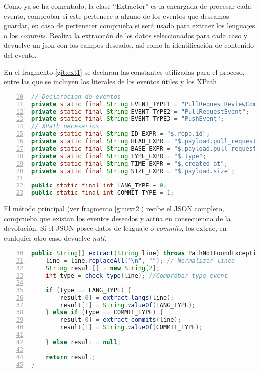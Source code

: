 Como ya se ha comentado, la clase ``Extractor'' es la encargada de procesar cada evento, comprobar si este pertenece a alguno de los eventos que deseamos guardar, en caso de pertenecer comprueba si será usado para extraer los lenguajes o los \textit{commits}. Realiza la extracción de los datos seleccionados para cada caso y devuelve un json con los campos deseados, así como la identificación de contenido del evento.

En el fragmento \ref{git:ext1} se declaran las constantes utilizadas para el proceso, entre las que se incluyen los literales de los eventos útiles y los \gls{XPath}

\clearpage
\begin{lstlisting}[label=git:ext1,language=java,frame=single,caption={Fragmento de la clase \textit{Extractor}. Declaración de constantes.}, firstnumber=10,numbers=left]
// Declaracion de eventos
private static final String EVENT_TYPE1 = "PullRequestReviewCommentEvent";
private static final String EVENT_TYPE2 = "PullRequestEvent";
private static final String EVENT_TYPE3 = "PushEvent";
// XPath necesarios
private static final String ID_EXPR = "$.repo.id";
private static final String HEAD_EXPR = "$.payload.pull_request.head.repo.language";
private static final String BASE_EXPR = "$.payload.pull_request.base.repo.language";
private static final String TYPE_EXPR = "$.type";
private static final String TIME_EXPR = "$.created_at";
private static final String SIZE_EXPR = "$.payload.size";

public static final int LANG_TYPE = 0;
public static final int COMMIT_TYPE = 1;
\end{lstlisting}

El método principal (ver fragmento \ref{git:ext2}) recibe el \gls{JSON} completo, comprueba que existan los eventos deseados y actúa en consecuencia de la devolución. Si el \gls{JSON} posee datos de lenguaje o \textit{commits}, los extrae, en cualquier otro caso devuelve \textit{null}.

\begin{lstlisting}[label=git:ext2,language=java,frame=single,caption={Fragmento de la clase \textit{Extractor}. Método principal.}, firstnumber=30,numbers=left]
public String[] extract(String line) throws PathNotFoundException {
	line = line.replaceAll("\n", ""); // Normalizar linea
	String result[] = new String[2];
	int type = check_type(line); //Comprobar type event
	
	if (type == LANG_TYPE) {
		result[0] = extract_langs(line);
		result[1] = String.valueOf(LANG_TYPE);
	} else if (type == COMMIT_TYPE) {
		result[0] = extract_commits(line);
		result[1] = String.valueOf(COMMIT_TYPE);
	
	} else result = null;
	
	return result;
}
\end{lstlisting}

